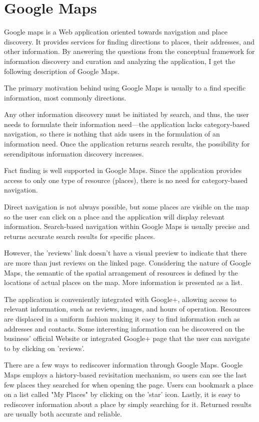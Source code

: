 {\section{Google Maps}
Google maps is a Web application oriented towards navigation and place discovery. It provides services for finding directions to places, their addresses, and other information. By answering the questions from the conceptual framework for information discovery and curation and analyzing the application, I get the following description of Google Maps.

The primary motivation behind using Google Maps is usually to a find specific information, most commonly directions.  

Any other information discovery must be initiated by search, and thus, the user needs to formulate their information need---the application lacks category-based navigation, so there is nothing that aids users in the formulation of an information need. Once the application returns search results, the possibility for serendipitous information discovery increases.  

Fact finding is well supported in Google Maps. Since the application provides access to only one type of resource (places), there is no need for category-based navigation. 

Direct navigation is not always possible, but some places are visible on the map so the user can click on a place and the application will display relevant information. Search-based navigation within Google Maps is usually precise and returns accurate search results for specific places. 

However, the 'reviews' link doesn't have a visual preview to indicate that there are more than just reviews on the linked page. Considering the nature of Google Maps, the semantic of the spatial arrangement of resources is defined by the locations of actual places on the map. More information is presented as a list. 

The application is conveniently integrated with Google+, allowing access to relevant information, such as reviews, images, and hours of operation. Resources are displaced in a uniform fashion making it easy to find information such as addresses and contacts. Some interesting information can be discovered on the business' official Website or integrated Google+ page that the user can navigate to by clicking on 'reviews'.

There are a few ways to rediscover information through Google Maps. Google Maps employs a history-based revisitation mechanism, so users can see the last few places they searched for when opening the page. Users can bookmark a place on a list called "My Places" by clicking on the 'star' icon. Lastly, it is easy to rediscover information about a place by simply searching for it. Returned results are usually both accurate and reliable.

}
